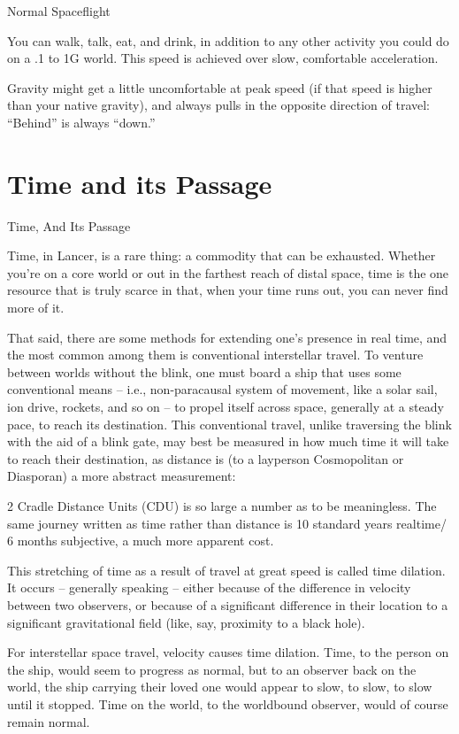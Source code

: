 Normal Spaceflight




You can walk, talk, eat, and drink, in addition to any other activity you could do on a .1 to 1G
world. This speed is achieved over slow, comfortable acceleration.


Gravity might get a little uncomfortable at peak speed (if that speed is higher than your
native gravity), and always pulls in the opposite direction of travel: “Behind” is always
“down.”

\section{Time and its Passage}
Time, And Its Passage

Time, in Lancer, is a rare thing: a commodity that can be exhausted. Whether you’re on a core
world or out in the farthest reach of distal space, time is the one resource that is truly scarce in
that, when your time runs out, you can never find more of it.

That said, there are some methods for extending one’s presence in real time, and the most
common among them is conventional interstellar travel. To venture between worlds without the
blink, one must board a ship that uses some conventional means  -- i.e., non-paracausal system
of movement, like a solar sail, ion drive, rockets, and so on -- to propel itself across space,
generally at a steady pace, to reach its destination. This conventional travel, unlike traversing the
blink with the aid of a blink gate, may best be measured in how much time it will take to reach
their destination, as distance is (to a layperson Cosmopolitan or Diasporan) a more abstract
measurement:

2 Cradle Distance Units (CDU) is so large a number as to be meaningless. The same journey
written as time rather than distance is 10 standard years realtime/ 6 months subjective, a much
more apparent cost.

This stretching of time as a result of travel at great speed is called time dilation. It occurs --
generally speaking -- either because of the difference in velocity between two observers, or
because of a significant difference in their location to a significant gravitational field (like,
say, proximity to a black hole).

For interstellar space travel, velocity causes time dilation. Time, to the person on the ship,
would seem to progress as normal, but to an observer back on the world, the ship carrying
their loved one would appear to slow, to slow, to slow until it stopped. Time on the world, to
the worldbound observer, would of course remain normal.

